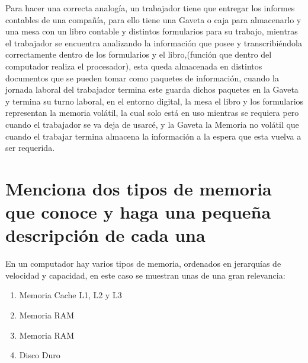 \documentclass{article}
\begin{document}
	 Para hacer una correcta analogía, un trabajador tiene que entregar los informes contables de una compañía, para ello tiene una Gaveta o caja para almacenarlo y una mesa con un libro contable y distintos formularios para su trabajo, mientras el trabajador se encuentra analizando la información que posee y transcribiéndola correctamente dentro de los formularios y el libro,(función que dentro del computador realiza el procesador), esta queda almacenada en distintos documentos que se pueden tomar como paquetes de información, cuando la jornada laboral del trabajador termina este guarda dichos paquetes en la Gaveta y termina su turno laboral, en el entorno digital, la mesa el libro y los formularios representan la memoria volátil, la cual solo está en uso mientras se requiera pero cuando el trabajador se va deja de usarcé, y la Gaveta la Memoria no volátil que cuando el trabajar termina almacena la información a la espera que esta vuelva a ser requerida.
	 
	\newpage
	
	\section{Menciona dos tipos de memoria que conoce y haga una pequeña descripción de cada una} \label{menciona}
	En un computador hay varios tipos de memoria, ordenados en jerarquías de velocidad y
capacidad, en este caso se muestran unas de una gran relevancia:\cite{youbioit}
	
	\begin{enumerate}
		
		\item Memoria Cache L1, L2 y L3
		\item Memoria RAM
		\item Memoria RAM
		\item Disco Duro
		
	\end{enumerate}
	
\end{document}
